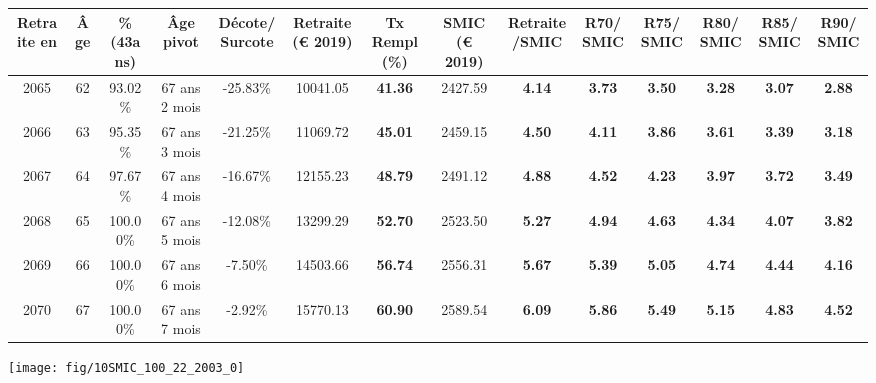 \begin{adjustbox}{max width=\textwidth} 
\begin{tabular}[htb]{|c|c||c|c|c||c|c||c|c||c|c|c|c|c|} 
\hline 
 Retraite en &  Âge &  \%(43ans) &  Âge pivot &  Décote/Surcote &  Retraite (\euro{} 2019) &  Tx Rempl(\%) &  SMIC (\euro{} 2019) &  Retraite/SMIC &  R70/SMIC &  R75/SMIC &  R80/SMIC &  R85/SMIC &  R90/SMIC \\ 
\hline \hline 
 2065 &  62 &  93.02\% &  67 ans 2 mois &  -25.83\% &  10041.05 &  {\bf 41.36} &  2427.59 &  {\bf 4.14} &  {\bf 3.73} &  {\bf 3.50} &  {\bf 3.28} &  {\bf 3.07} &  {\bf 2.88} \\ 
\hline 
 2066 &  63 &  95.35\% &  67 ans 3 mois &  -21.25\% &  11069.72 &  {\bf 45.01} &  2459.15 &  {\bf 4.50} &  {\bf 4.11} &  {\bf 3.86} &  {\bf 3.61} &  {\bf 3.39} &  {\bf 3.18} \\ 
\hline 
 2067 &  64 &  97.67\% &  67 ans 4 mois &  -16.67\% &  12155.23 &  {\bf 48.79} &  2491.12 &  {\bf 4.88} &  {\bf 4.52} &  {\bf 4.23} &  {\bf 3.97} &  {\bf 3.72} &  {\bf 3.49} \\ 
\hline 
 2068 &  65 &  100.00\% &  67 ans 5 mois &  -12.08\% &  13299.29 &  {\bf 52.70} &  2523.50 &  {\bf 5.27} &  {\bf 4.94} &  {\bf 4.63} &  {\bf 4.34} &  {\bf 4.07} &  {\bf 3.82} \\ 
\hline 
 2069 &  66 &  100.00\% &  67 ans 6 mois &  -7.50\% &  14503.66 &  {\bf 56.74} &  2556.31 &  {\bf 5.67} &  {\bf 5.39} &  {\bf 5.05} &  {\bf 4.74} &  {\bf 4.44} &  {\bf 4.16} \\ 
\hline 
 2070 &  67 &  100.00\% &  67 ans 7 mois &  -2.92\% &  15770.13 &  {\bf 60.90} &  2589.54 &  {\bf 6.09} &  {\bf 5.86} &  {\bf 5.49} &  {\bf 5.15} &  {\bf 4.83} &  {\bf 4.52} \\ 
\hline 
\hline 
\end{tabular} 
\end{adjustbox} 
 
 \vspace{0.1cm} 

 {\hspace{-2.2cm}\texttt{[image: fig/10SMIC\_100\_22\_2003\_0]}} 

\newpage 
 
